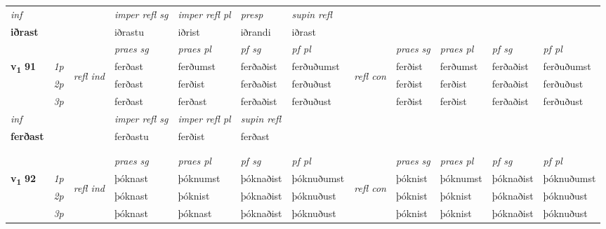 \begin{longtable}[l]{X>{\footnotesize\itshape}llXXXXlXXXX}
   {\textit{inf}} & &   & \textit{imper refl sg} & \textit{imper refl pl} & \textit{presp}  & \textit{supin refl}  \\*
  {\textbf{iðrast}} & &   & iðrastu & iðrist & iðrandi  & iðrast  \\*

\midrule

 & &   & \textit{praes sg}  & \textit{praes pl}    & \textit{ pf sg} & \textit{pf pl} & & \textit{praes sg}  & \textit{praes pl}    & \textit{pf sg} & \textit{pf pl }  \\ \cmidrule{4-7} \cmidrule{9-12}
 \multirow{2}{*}{{{\textbf{v{\textsubscript{1}}} \Large{\textbf{91}}}}}  & 1p & \multirow{3}{*}{\begin{turn}{90}\textit{refl ind}\end{turn}}  & ferðast & ferðumst & ferðaðist & ferðuðumst & \multirow{3}{*}{\begin{turn}{90}\textit{refl con}\end{turn}}  &ferðist & ferðumst & ferðaðist & ferðuðumst \\*
 & 2p &  & ferðast & ferðist & ferðaðist & ferðuðust & &ferðist & ferðist & ferðaðist & ferðuðust \\*
 & 3p  & & ferðast & ferðast & ferðaðist & ferðuðust & & ferðist & ferðist& ferðaðist & ferðuðust \\*
\cmidrule{4-7} \cmidrule{9-12}

   {\textit{inf}} & &   & \textit{imper refl sg} & \textit{imper refl pl}   & \textit{supin refl}  \\*
  {\textbf{ferðast}} & &   & ferðastu & ferðist   & ferðast  \\*

\midrule
  

 
   & \\*
  & \\
   \midrule
 & &   & \textit{praes sg}  & \textit{praes pl}    & \textit{ pf sg} & \textit{pf pl} & & \textit{praes sg}  & \textit{praes pl}    & \textit{pf sg} & \textit{pf pl }  \\ \cmidrule{4-7} \cmidrule{9-12}
 \multirow{2}{*}{{{\textbf{v{\textsubscript{1}}} \Large{\textbf{92}}}}}  & 1p & \multirow{3}{*}{\begin{turn}{90}\textit{refl ind}\end{turn}}  & þóknast & þóknumst & þóknaðist & þóknuðumst & \multirow{3}{*}{\begin{turn}{90}\textit{refl con}\end{turn}}  &þóknist & þóknumst & þóknaðist & þóknuðumst \\*
 & 2p &  & þóknast & þóknist & þóknaðist & þóknuðust & &þóknist & þóknist & þóknaðist & þóknuðust \\*
 & 3p  & & þóknast & þóknast & þóknaðist & þóknuðust & & þóknist & þóknist& þóknaðist & þóknuðust \\*
\cmidrule{4-7} \cmidrule{9-12}


\end{longtable}
